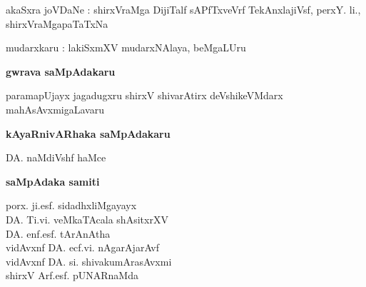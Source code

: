 \bigskip

\noindent
akaSxra joVDaNe : shirxVraMga DijiTalf sAPfTxveVrf TekAnxlajiVsf, perxY. li., shirxVraMgapaTaTxNa

\medskip

\noindent
mudarxkaru : lakiSxmXV mudarxNAlaya, beMgaLUru

\newpage

\thispagestyle{empty}

\phantom{a}

\vfill

\begin{center}


{\Large\bf gwrava saMpAdakaru}\\

\medskip

{\large paramapUjayx jagadugxru shirxV shivarAtirx deVshikeVMdarx mahAsAvxmigaLavaru}

\vskip 1cm

{\Large\bf kAyaRnivARhaka saMpAdakaru}

\medskip

{\fontsize{14pt}{16pt}\selectfont
DA. naMdiVshf haMce}\relax

\vskip 1cm


{\Large\bf saMpAdaka samiti}

\bigskip
\medskip

{\fontsize{14pt}{16pt}\selectfont
porx. ji.esf. sidadhxliMgayayx\\[8pt]
DA. Ti.vi. veMkaTAcala shAsitxrXV\\[8pt]
DA. enf.esf. tArAnAtha\\[8pt]
vidAvxnf DA. ecf.vi. nAgarAjarAvf\\[8pt]
vidAvxnf DA. si. shivakumArasAvxmi\\[8pt]
shirxV Arf.esf. pUNARnaMda\\[15pt]
}\relax
\end{center}

\vfill

\phantom{a}







